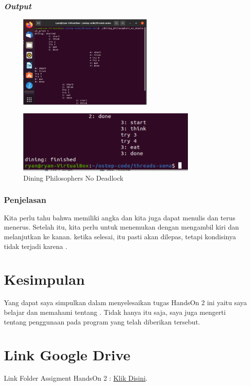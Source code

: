\documentclass[11pt,a4paper]{article}
\begin{document}
\subsubsection{\textit{Output}}
 \begin{figure}[h]
	\centering
	\includegraphics[width=0.6\textwidth]{Figure/dining_no_deadlock_print(1).png}
    \end{figure}
    \begin{figure}[h]
	\centering
	\includegraphics[width=0.8\textwidth]{Figure/dining_no_deadlock_print(2).png}
	\caption{Dining Philosophers No Deadlock}
    \end{figure}
\subsubsection{Penjelasan}
Kita perlu tahu bahwa  memiliki angka dan kita juga dapat menulis  dan  terus menerus. Setelah itu, kita perlu  untuk menemukan  dengan mengambil  kiri dan melanjutkan ke kanan. ketika selesai, itu pasti akan dilepas, tetapi kondisinya tidak terjadi karena .
 
\section{Kesimpulan}
     Yang dapat saya simpulkan dalam menyelesaikan tugas HandsOn 2 ini yaitu saya belajar dan memahami tentang . Tidak hanya itu saja, saya juga mengerti tentang penggunaan  pada program yang telah diberikan  tersebut.
     
\section{Link Google Drive}
Link Folder Assigment HandsOn 2 : \href{https://drive.google.com/drive/folders/1HrX1BeNBsXnGzcpViksC96O-c1VZsPWD?usp=sharing}{Klik Disini}.
\end{document}
